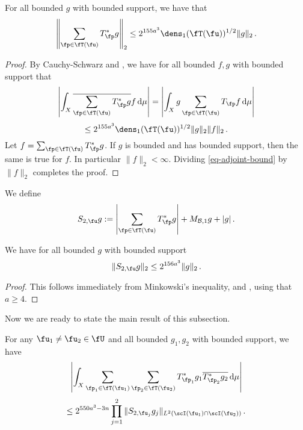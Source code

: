 \begin{lemma}
    \label{adjoint-tree-estimate}
    For all bounded $g$ with bounded support, we have that
    $$
        \left\| \sum_{\fp \in \fT(\fu)} T_{\fp}^* g\right\|_2 \le 2^{155a^3} \dens_1(\fT(\fu))^{1/2} \|g\|_2\,.
    $$
\end{lemma}

\begin{proof}
    By Cauchy-Schwarz and , we have for all bounded $f,g$ with bounded support that
    $$
        \left| \int_X \overline{\sum_{\fp\in \fT(\fu)} T_{\fp}^* g} f \,\mathrm{d}\mu \right| = \left| \int_X g \sum_{\fp \in \fT(\fu)} T_{\fp} f \,\mathrm{d}\mu \right|
    $$
    \begin{equation}
        \label{eq-adjoint-bound}
        \le 2^{155a^3} \dens_1(\fT(\fu))^{1/2} \|g\|_2 \|f\|_2\,.
    \end{equation}
    Let $f = \sum_{\fp \in \fT(\fu)} T_{\fp}^* g$. If $g$ is bounded and has bounded support, then the same is true for $f$. In particular $\|f\|_2 < \infty$. Dividing \eqref{eq-adjoint-bound} by $\|f\|_2$ completes the proof.
\end{proof}

We define
$$
    S_{2,\fu}g := \left|\sum_{\fp \in \fT(\fu)} T_{\fp}^*g \right| + M_{\mathcal{B},1}g + |g|\,.
$$
\begin{lemma}
    \label{adjoint-tree-control}
    We have for all bounded $g$ with bounded support
    $$
        \|S_{2, \fu} g\|_2 \le 2^{156a^3} \|g\|_2\,.
    $$
\end{lemma}

\begin{proof}
    This follows immediately from Minkowski's inequality, and , using that $a \ge 4$.
\end{proof}


Now we are ready to state the main result of this subsection.

\begin{lemma}
    \label{correlation-separated-trees}
    For any $\fu_1 \ne \fu_2 \in \fU$ and all bounded $g_1, g_2$ with bounded support, we have
    \begin{equation}
        \label{eq-lhs-sep-tree}
        \left| \int_X \sum_{\fp_1 \in \fT(\fu_1)} \sum_{\fp_2 \in \fT(\fu_2)} T^*_{\fp_1}g_1 \overline{T^*_{\fp_2}g_2 }\,\mathrm{d}\mu \right|
    \end{equation}
    \begin{equation}
        \label{eq-rhs-sep-tree}
        \le 2^{550a^3-3n} \prod_{j =1}^2 \| S_{2, \fu_j} g_j\|_{L^2(\scI(\fu_1) \cap \scI(\fu_2))}\,.
    \end{equation}
\end{lemma}

